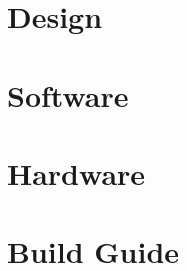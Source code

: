\documentclass[12pt]{report}
\begin{document}
\chapter{Design}

\chapter{Software}

\chapter{Hardware}

\chapter{Build Guide}

\end{document}
